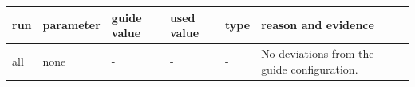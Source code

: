\begin{tabular}{llllll}
\hline
run & parameter & guide value & used value & type & reason and evidence \\
\hline
all & none & - & - & - & No deviations from the guide configuration. \\
\hline
\end{tabular}

